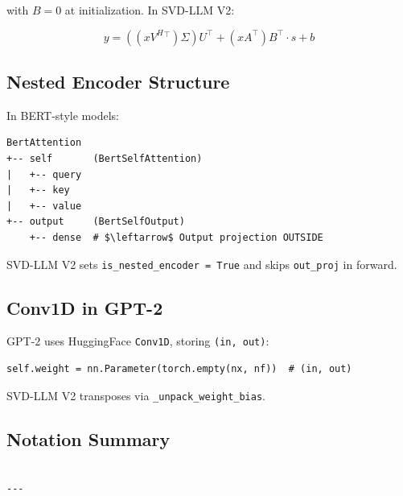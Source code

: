 with $B = 0$ at initialization. In SVD-LLM V2:

\[
y = ((x V^H{}^\top) \Sigma) U^\top + (x A^\top) B^\top \cdot s + b
\tag{3.12}
\]

\subsection{Nested Encoder Structure}

In BERT-style models:

\begin{lstlisting}
BertAttention
+-- self       (BertSelfAttention)
|   +-- query
|   +-- key
|   +-- value
+-- output     (BertSelfOutput)
    +-- dense  # $\leftarrow$ Output projection OUTSIDE
\end{lstlisting}

SVD-LLM V2 sets \texttt{is\_nested\_encoder = True} and skips \texttt{out\_proj} in forward.

\subsection{Conv1D in GPT-2}

GPT-2 uses HuggingFace \texttt{Conv1D}, storing \texttt{(in, out)}:

\begin{lstlisting}
self.weight = nn.Parameter(torch.empty(nx, nf))  # (in, out)
\end{lstlisting}

SVD-LLM V2 transposes via \texttt{\_unpack\_weight\_bias}.

\subsection{Notation Summary}

\begin{lstlisting}

---
\end{lstlisting}